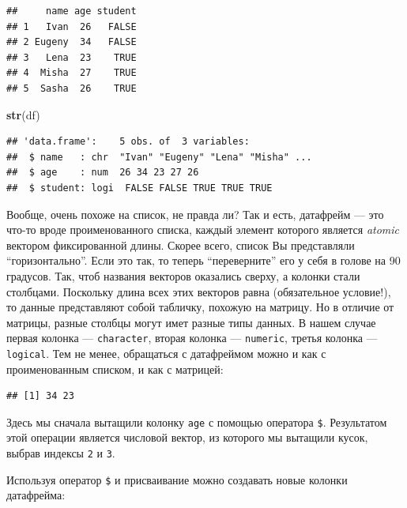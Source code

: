 \documentclass[]{book}
\newenvironment{Shaded}{\begin{snugshade}}{\end{snugshade}}
\newcommand{\KeywordTok}[1]{\textcolor[rgb]{0.13,0.29,0.53}{\textbf{#1}}}
\newcommand{\DecValTok}[1]{\textcolor[rgb]{0.00,0.00,0.81}{#1}}
\newcommand{\OperatorTok}[1]{\textcolor[rgb]{0.81,0.36,0.00}{\textbf{#1}}}
\newcommand{\NormalTok}[1]{#1}
\begin{document}
\begin{verbatim}
##     name age student
## 1   Ivan  26   FALSE
## 2 Eugeny  34   FALSE
## 3   Lena  23    TRUE
## 4  Misha  27    TRUE
## 5  Sasha  26    TRUE
\end{verbatim}

\begin{Shaded}
\begin{Highlighting}[]
\KeywordTok{str}\NormalTok{(df)}
\end{Highlighting}
\end{Shaded}

\begin{verbatim}
## 'data.frame':    5 obs. of  3 variables:
##  $ name   : chr  "Ivan" "Eugeny" "Lena" "Misha" ...
##  $ age    : num  26 34 23 27 26
##  $ student: logi  FALSE FALSE TRUE TRUE TRUE
\end{verbatim}

Вообще, очень похоже на список, не правда ли? Так и есть, датафрейм ---
это что-то вроде проименованного списка, каждый элемент которого
является \emph{atomic} вектором фиксированной длины. Скорее всего,
список Вы представляли ``горизонтально''. Если это так, то теперь
``переверните'' его у себя в голове на 90 градусов. Так, чтоб названия
векторов оказались сверху, а колонки стали столбцами. Поскольку длина
всех этих векторов равна (обязательное условие!), то данные представляют
собой табличку, похожую на матрицу. Но в отличие от матрицы, разные
столбцы могут имет разные типы данных. В нашем случае первая колонка ---
\texttt{character}, вторая колонка --- \texttt{numeric}, третья колонка
--- \texttt{logical}. Тем не менее, обращаться с датафреймом можно и как
с проименованным списком, и как с матрицей:

\begin{Shaded}
\end{Shaded}

\begin{verbatim}
## [1] 34 23
\end{verbatim}

Здесь мы сначала вытащили колонку \texttt{age} с помощью оператора
\texttt{\$}. Результатом этой операции является числовой вектор, из
которого мы вытащили кусок, выбрав индексы \texttt{2} и \texttt{3}.

Используя оператор \texttt{\$} и присваивание можно создавать новые
колонки датафрейма:
\end{document}
